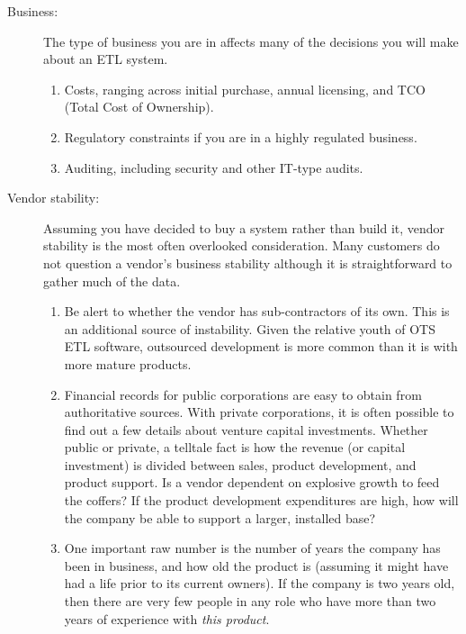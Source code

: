 \documentclass[11pt,letterpaper,twosided]{memoir}
\begin{document}
\begin{description}
\item[Business:] The type of business you are in affects many of
the decisions you will make about an ETL system.

\begin{enumerate}
\item Costs, ranging across initial purchase, annual licensing, and
TCO (Total Cost of Ownership).

\item Regulatory constraints if you are in a highly regulated business.

\item Auditing, including security and other IT-type audits.

\end{enumerate}

\item[Vendor stability:] Assuming you have decided to buy a system
rather than build it, vendor stability is the most often overlooked 
consideration. Many customers do not question a vendor's business stability
although it is straightforward to gather much of the data.

\begin{enumerate}
\item Be alert to whether the vendor has sub-contractors of its own.
This is an additional source of instability. Given the relative
youth of OTS ETL software, outsourced development is more common
than it is with more mature products.

\item Financial records for public corporations are easy to obtain
from authoritative sources. With private corporations, it is often
possible to find out a few details about venture capital investments.
Whether public or private, a telltale fact is how the revenue (or
capital investment) is divided between sales, product development, 
and product support. Is a vendor dependent on explosive growth
to feed the coffers? If the product development expenditures are
high, how will the company be able to support a larger, installed
base?

\item One important raw number is the number of years the company
has been in business, and how old the product is (assuming it might
have had a life prior to its current owners). If the company is 
two years old, then there are very few people in any role who have
more than two years of experience with \emph{this product}.


\end{enumerate}
\end{description}
\end{document}
